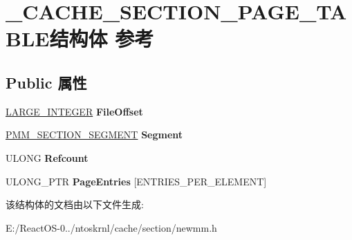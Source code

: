\hypertarget{struct___c_a_c_h_e___s_e_c_t_i_o_n___p_a_g_e___t_a_b_l_e}{}\section{\+\_\+\+C\+A\+C\+H\+E\+\_\+\+S\+E\+C\+T\+I\+O\+N\+\_\+\+P\+A\+G\+E\+\_\+\+T\+A\+B\+L\+E结构体 参考}
\label{struct___c_a_c_h_e___s_e_c_t_i_o_n___p_a_g_e___t_a_b_l_e}
\subsection*{Public 属性}
\begin{DoxyCompactItemize}
\item 
\mbox{\label{struct___c_a_c_h_e___s_e_c_t_i_o_n___p_a_g_e___t_a_b_l_e_ab32535b6d414b949479c732e242feeba}} 
\hyperlink{union___l_a_r_g_e___i_n_t_e_g_e_r}{L\+A\+R\+G\+E\+\_\+\+I\+N\+T\+E\+G\+ER} {\bfseries File\+Offset}
\item 
\mbox{\label{struct___c_a_c_h_e___s_e_c_t_i_o_n___p_a_g_e___t_a_b_l_e_aa451768f6fa6e57b775fdf3f7328aeae}} 
\hyperlink{struct___m_m___s_e_c_t_i_o_n___s_e_g_m_e_n_t}{P\+M\+M\+\_\+\+S\+E\+C\+T\+I\+O\+N\+\_\+\+S\+E\+G\+M\+E\+NT} {\bfseries Segment}
\item 
\mbox{\label{struct___c_a_c_h_e___s_e_c_t_i_o_n___p_a_g_e___t_a_b_l_e_a0b6d878c92e455af9b106c41a54b9e31}} 
U\+L\+O\+NG {\bfseries Refcount}
\item 
\mbox{\label{struct___c_a_c_h_e___s_e_c_t_i_o_n___p_a_g_e___t_a_b_l_e_aebaab271218bc3e5e7dd8983debdfef9}} 
U\+L\+O\+N\+G\+\_\+\+P\+TR {\bfseries Page\+Entries} \mbox{[}E\+N\+T\+R\+I\+E\+S\+\_\+\+P\+E\+R\+\_\+\+E\+L\+E\+M\+E\+NT\mbox{]}
\end{DoxyCompactItemize}


该结构体的文档由以下文件生成\+:\begin{DoxyCompactItemize}
\item 
E\+:/\+React\+O\+S-\/0../ntoskrnl/cache/section/newmm.\+h\end{DoxyCompactItemize}
